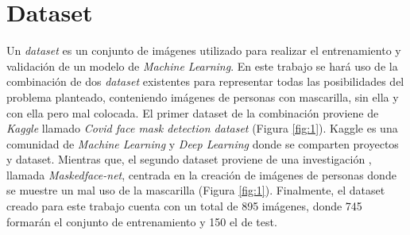 \vspace{-0.7cm}
\section*{Dataset} \label{dataset}
\vspace{-0.5cm}

Un \textit{dataset} es un conjunto de imágenes utilizado para realizar el entrenamiento y validación de un modelo de \textit{Machine Learning}. En este trabajo se hará uso de la combinación de dos \textit{dataset} existentes para representar todas las posibilidades del problema planteado, conteniendo imágenes de personas con mascarilla, sin ella y con ella pero mal colocada. El primer dataset de la combinación proviene de \textit{Kaggle} llamado \textit{Covid face mask detection dataset} \cite{datasetMask} (Figura \ref{fig:1}). Kaggle es una comunidad de \textit{Machine Learning} y \textit{Deep Learning} donde se comparten proyectos y dataset. Mientras que, el segundo dataset proviene de una investigación \cite{Cabani_2021}, llamada \textit{Maskedface-net}, centrada en la creación de imágenes de personas donde se muestre un mal uso de la mascarilla (Figura \ref{fig:1}). Finalmente, el dataset creado para este trabajo cuenta con un total de 895 imágenes, donde 745 formarán el conjunto de entrenamiento y 150 el de test.

\vspace{0.3cm}

